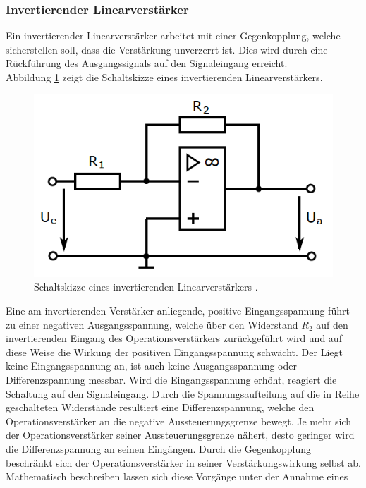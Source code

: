 \subsubsection{Invertierender Linearverstärker}
Ein invertierender Linearverstärker arbeitet mit einer Gegenkopplung, welche
sicherstellen soll, dass die Verstärkung unverzerrt ist. Dies wird durch eine
Rückführung des Ausgangssignals auf den Signaleingang erreicht. \\
Abbildung \ref{fig:03} zeigt die Schaltskizze eines invertierenden
Linearverstärkers. \\
\FloatBarrier
\begin{figure}
  \centering
  \includegraphics[scale=0.7]{ressources/figure_03.png}
  \caption{Schaltskizze eines invertierenden Linearverstärkers \cite{sample}.}
  \label{fig:03}
\end{figure}
\FloatBarrier
\noindent Eine am invertierenden Verstärker anliegende, positive Eingangsspannung
führt zu einer negativen Ausgangsspannung, welche über den Widerstand
$R_2$ auf den invertierenden Eingang des Operationsverstärkers zurückgeführt
wird und auf diese Weise die Wirkung der positiven Eingangsspannung schwächt.
Der Liegt keine Eingangsspannung an, ist auch keine Ausgangsspannung oder
Differenzspannung messbar. Wird die Eingangsspannung erhöht, reagiert die Schaltung
auf den Signaleingang. Durch die Spannungsaufteilung auf die in Reihe
geschalteten Widerstände resultiert eine Differenzspannung, welche den
Operationsverstärker an die negative Aussteuerungsgrenze bewegt. Je mehr sich
der Operationsverstärker seiner Aussteuerungsgrenze nähert, desto geringer wird
die Differenzspannung an seinen Eingängen. Durch die Gegenkopplung beschränkt sich
der Operationsverstärker in seiner Verstärkungswirkung selbst ab.
Mathematisch beschreiben lassen sich diese Vorgänge unter der Annahme eines
